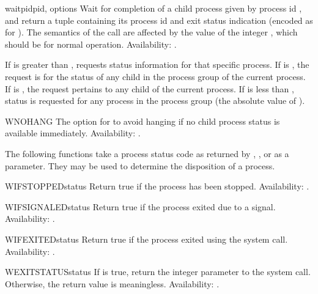 \begin{funcdesc}{waitpid}{pid, options}
Wait for completion of a child process given by process id ,
and return a tuple containing its process id and exit status
indication (encoded as for ).  The semantics of the
call are affected by the value of the integer , which
should be  for normal operation.
Availability: \UNIX{}.

If  is greater than ,  requests
status information for that specific process.  If  is
, the request is for the status of any child in the process
group of the current process.  If  is , the request
pertains to any child of the current process.  If  is less
than , status is requested for any process in the process
group  (the absolute value of ).
\end{funcdesc}

\begin{datadesc}{WNOHANG}
The option for  to avoid hanging if no child
process status is available immediately.
Availability: \UNIX{}.
\end{datadesc}

The following functions take a process status code as returned by
, , or  as a
parameter.  They may be used to determine the disposition of a
process.

\begin{funcdesc}{WIFSTOPPED}{status}
Return true if the process has been stopped.
Availability: \UNIX{}.
\end{funcdesc}

\begin{funcdesc}{WIFSIGNALED}{status}
Return true if the process exited due to a signal.
Availability: \UNIX{}.
\end{funcdesc}

\begin{funcdesc}{WIFEXITED}{status}
Return true if the process exited using the  system
call.
Availability: \UNIX{}.
\end{funcdesc}

\begin{funcdesc}{WEXITSTATUS}{status}
If  is true, return the integer
parameter to the  system call.  Otherwise, the return 
value is meaningless.
Availability: \UNIX{}.
\end{funcdesc}

